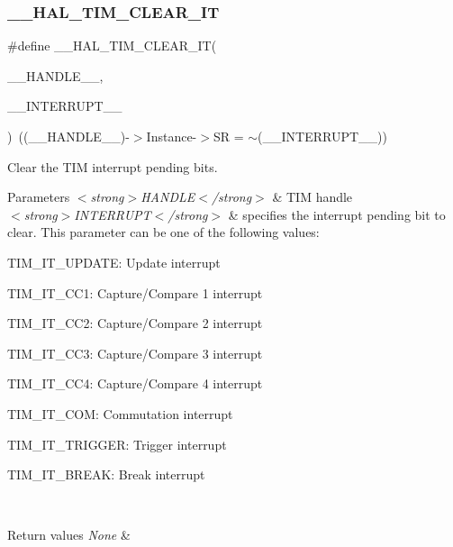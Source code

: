 \subsubsection{\texorpdfstring{\+\_\+\+\_\+\+H\+A\+L\+\_\+\+T\+I\+M\+\_\+\+C\+L\+E\+A\+R\+\_\+\+IT}{\_\_HAL\_TIM\_CLEAR\_IT}}
{\footnotesize\ttfamily \#define \+\_\+\+\_\+\+H\+A\+L\+\_\+\+T\+I\+M\+\_\+\+C\+L\+E\+A\+R\+\_\+\+IT(\begin{DoxyParamCaption}\item[{}]{\+\_\+\+\_\+\+H\+A\+N\+D\+L\+E\+\_\+\+\_\+,  }\item[{}]{\+\_\+\+\_\+\+I\+N\+T\+E\+R\+R\+U\+P\+T\+\_\+\+\_\+ }\end{DoxyParamCaption})~((\+\_\+\+\_\+\+H\+A\+N\+D\+L\+E\+\_\+\+\_\+)-\/$>$Instance-\/$>$SR = $\sim$(\+\_\+\+\_\+\+I\+N\+T\+E\+R\+R\+U\+P\+T\+\_\+\+\_\+))}



Clear the T\+IM interrupt pending bits. 


\begin{DoxyParams}{Parameters}
{\em $<$strong$>$\+H\+A\+N\+D\+L\+E$<$/strong$>$} & T\+IM handle \\
\hline
{\em $<$strong$>$\+I\+N\+T\+E\+R\+R\+U\+P\+T$<$/strong$>$} & specifies the interrupt pending bit to clear. This parameter can be one of the following values\+: \begin{DoxyItemize}
\item T\+I\+M\+\_\+\+I\+T\+\_\+\+U\+P\+D\+A\+TE\+: Update interrupt \item T\+I\+M\+\_\+\+I\+T\+\_\+\+C\+C1\+: Capture/\+Compare 1 interrupt \item T\+I\+M\+\_\+\+I\+T\+\_\+\+C\+C2\+: Capture/\+Compare 2 interrupt \item T\+I\+M\+\_\+\+I\+T\+\_\+\+C\+C3\+: Capture/\+Compare 3 interrupt \item T\+I\+M\+\_\+\+I\+T\+\_\+\+C\+C4\+: Capture/\+Compare 4 interrupt \item T\+I\+M\+\_\+\+I\+T\+\_\+\+C\+OM\+: Commutation interrupt \item T\+I\+M\+\_\+\+I\+T\+\_\+\+T\+R\+I\+G\+G\+ER\+: Trigger interrupt \item T\+I\+M\+\_\+\+I\+T\+\_\+\+B\+R\+E\+AK\+: Break interrupt \end{DoxyItemize}
\\
\hline
\end{DoxyParams}

\begin{DoxyRetVals}{Return values}
{\em None} & \\
\hline
\end{DoxyRetVals}
\mbox{\label{group___t_i_m___exported___macros_ga6a5e653e0e06a04151b74eb1a5f96eb6}} 
